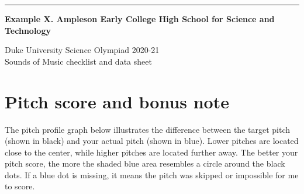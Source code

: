 \documentclass[12pt,letterpaper]{article}
\begin{document}
{\color{blue}\rule{7cm}{6pt}

{\bfseries\huge Example X. Ampleson Early College High School for Science and Technology}}

Duke University Science Olympiad 2020-21\\Sounds of Music checklist and data sheet

\section{Pitch score and bonus note}
The pitch profile graph below illustrates the difference between the target pitch (shown in black) and your actual pitch (shown in blue). Lower pitches are located close to the center, while higher pitches are located further away. The better your pitch score, the more the shaded blue area resembles a circle around the black dots. If a blue dot is missing, it means the pitch was skipped or impossible for me to score.
\end{document}
